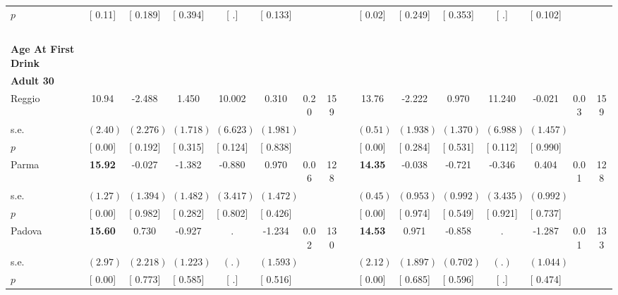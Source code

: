 \begin{longtable}{L{8em} c c c c c c c p{1em} c c c c c c c}
\quad \quad \quad \quad $ p$ & [     0.11] & [    0.189] & [    0.394] & [        .] & [    0.133] & & & & [     0.02] & [    0.249] & [    0.353] & [        .] & [    0.102] & &  \\[1em]
~\\[1em]
\textbf{Age At First Drink} \\*
\quad \quad \textbf{Adult 30} & & & & & & & & & & & & & & & \\* 
\quad \quad \quad Reggio& 10.94 &    -2.488 &     1.450 &    10.002 &     0.310 &      0.20 &       159 & & 13.76 &    -2.222 &     0.970 &    11.240 &    -0.021 &      0.03 &       159  \\*
\quad \quad \quad \quad s.e.& $ (     2.40)$ & $ (    2.276)$ & $ (    1.718)$ & $ (    6.623)$ & $ (    1.981)$ & & & & $ (     0.51)$ & $ (    1.938)$ & $ (    1.370)$ & $ (    6.988)$ & $ (    1.457)$ & &  \\*
\quad \quad \quad \quad $ p$ & [     0.00] & [    0.192] & [    0.315] & [    0.124] & [    0.838] & & & & [     0.00] & [    0.284] & [    0.531] & [    0.112] & [    0.990] & &  \\[1em]
\quad \quad \quad Parma& \textbf{    15.92} &    -0.027 &    -1.382 &    -0.880 &     0.970 &      0.06 &       128 & & \textbf{    14.35} &    -0.038 &    -0.721 &    -0.346 &     0.404 &      0.01 &       128  \\*
\quad \quad \quad \quad s.e.& $ (     1.27)$ & $ (    1.394)$ & $ (    1.482)$ & $ (    3.417)$ & $ (    1.472)$ & & & & $ (     0.45)$ & $ (    0.953)$ & $ (    0.992)$ & $ (    3.435)$ & $ (    0.992)$ & &  \\*
\quad \quad \quad \quad $ p$ & [     0.00] & [    0.982] & [    0.282] & [    0.802] & [    0.426] & & & & [     0.00] & [    0.974] & [    0.549] & [    0.921] & [    0.737] & &  \\[1em]
\quad \quad \quad Padova& \textbf{    15.60} &     0.730 &    -0.927 &         . &    -1.234 &      0.02 &       130 & & \textbf{    14.53} &     0.971 &    -0.858 &         . &    -1.287 &      0.01 &       133  \\*
\quad \quad \quad \quad s.e.& $ (     2.97)$ & $ (    2.218)$ & $ (    1.223)$ & $ (        .)$ & $ (    1.593)$ & & & & $ (     2.12)$ & $ (    1.897)$ & $ (    0.702)$ & $ (        .)$ & $ (    1.044)$ & &  \\*
\quad \quad \quad \quad $ p$ & [     0.00] & [    0.773] & [    0.585] & [        .] & [    0.516] & & & & [     0.00] & [    0.685] & [    0.596] & [        .] & [    0.474] & &  \\[1em]

\end{longtable}

